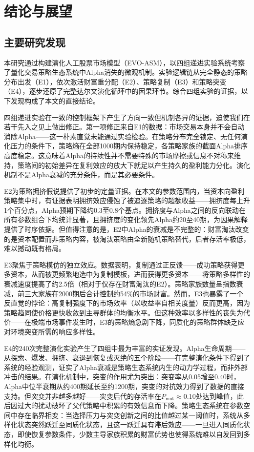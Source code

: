 ﻿\chapter{结论与展望}
\label{chap:conclusion}

\section{主要研究发现}

本研究通过构建演化人工股票市场模型（EVO-ASM），以四组递进实验系统考察了量化交易策略生态系统中Alpha消失的微观机制。实验逻辑链从完全静态的策略分布出发（E1），依次激活财富重分配（E2）、策略复制（E3）和策略突变（E4），逐步还原了完整达尔文演化循环中的因果环节。综合四组实验的证据，以下发现构成了本文的直接结论。

四组递进实验在一致的控制框架下产生了方向一致但机制各异的证据，迫使我们在若干先入之见上做出修正。第一项修正来自E1的数据：市场交易本身并不会自动消除Alpha——这一朴素直觉未能通过实验检验。在策略分布完全锁定、无任何演化压力的条件下，策略熵在全部1000期内保持稳定，各策略家族的截面Alpha排序高度稳定。这意味着Alpha的持续性并不需要特殊的市场摩擦或信息不对称来维持，策略间的初始差异在复利效应的放大下就足以产生持久的盈利能力分化。演化机制不是Alpha衰减的充分条件，而是其必要条件。

E2为策略拥挤假说提供了初步的定量证据。在本文的参数范围内，当资本向盈利策略集中时，有证据表明拥挤效应侵蚀了被追逐策略的超额收益——拥挤度每上升1个百分点，Alpha预期下降约0.3至0.8个基点。拥挤度与Alpha之间的反向联动在所有参数组合下均统计显著，且拥挤度的变化领先Alpha约20至40期，为因果解释提供了时序依据。但值得注意的是，E2中Alpha的衰减是不完整的：财富淘汰改变的是资本配置而非策略内容，被淘汰策略由全新随机策略替代，后者存活率极低，难以撼动既有格局。

E3聚焦于策略模仿的独立效应。数据表明，复制通过正反馈——成功策略获得更多资本，从而被更频繁地选中为复制模板，进而获得更多资本——将策略多样性的衰减速度提高了约2.5倍（相对于仅存在财富淘汰的E2）。策略家族数量呈指数衰减，前三大家族在2000期后合计控制约54\%的市场财富。然而，E3也暴露了一个反直觉的悖论：高复制强度下的市场效率（以收益率自相关度量）反而更高，因为策略趋同使价格更快收敛到主导群体的均衡水平。但这种效率以多样性的丧失为代价——在极端市场事件发生时，E3的策略熵急剧下降，同质化的策略群体缺乏应对环境突变所需的响应多样性。

E4的240次完整演化实验产生了四组中最为丰富的实证发现。Alpha生命周期——从探索、爆发、拥挤、衰退到恢复或灭绝的五个阶段——在完整演化条件下得到了系统的经验观测，证实了Alpha衰减是策略生态系统内生的动力学过程，而非外部冲击的结果。在演化机制中，突变的作用尤为突出：突变率从0.05增至0.40时，Alpha中位半衰期从约400期延长至约1200期，突变的对抗效力得到了数据的直接支持。但突变并非越多越好——突变后代的存活率在$P_{\text{mut}} \approx 0.10$处达到峰值，此后因过大的扰动破坏了父代策略中积累的有效信息而下降。策略生态系统在参数空间中存在临界相变：当选择压力与突变创新之间的比值越过某一阈值时，系统从多样化状态突然跃迁至同质化状态，且这一跃迁具有滞后效应——一旦进入同质化状态，即使恢复参数条件，少数主导家族积累的财富优势也使得系统难以自发回到多样化均衡。

